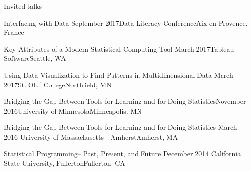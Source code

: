 \documentclass{resume} %
\begin{document}
\begin{rSection}{Invited talks}

\begin{sSubsection}{Interfacing with Data}{ }{September 2017}{Data Literacy Conference}{Aix-en-Provence, France}
\end{sSubsection}

\begin{sSubsection}{Key Attributes of a Modern Statistical Computing Tool}{ }{March 2017}{Tableau Software}{Seattle, WA}
\end{sSubsection}

\begin{sSubsection}{Using Data Visualization to Find Patterns in Multidimensional Data}{ }{March 2017}{St. Olaf College}{Northfield, MN}
\end{sSubsection}

\begin{sSubsection}{Bridging the Gap Between Tools for Learning and for Doing Statistics}{}{November 2016}{University of Minnesota}{Minneapolis, MN}
\end{sSubsection}

\begin{sSubsection}{Bridging the Gap Between Tools for Learning and for Doing Statistics}{ }{March 2016 }{University of Massachusetts - Amherst}{Amherst, MA}
\end{sSubsection}

\begin{sSubsection}{Statistical Programming-- Past, Present, and Future}{ }{December 2014 }{California State University, Fullerton}{Fullerton, CA}
\end{sSubsection}



\end{rSection}
\end{document}
